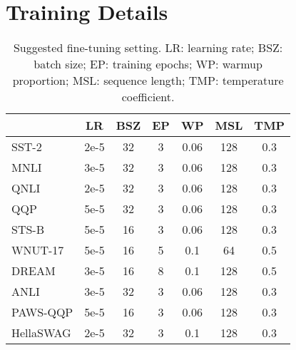 \documentclass[letterpaper]{article} \usepackage{aaai23}  \usepackage{times}  \usepackage{helvet}  \usepackage{courier}  \usepackage[hyphens]{url}  \usepackage{graphicx} \urlstyle{rm} \def\UrlFont{\rm}  \usepackage{natbib}  \usepackage{caption} \frenchspacing  \setlength{\pdfpagewidth}{8.5in}  \setlength{\pdfpageheight}{11in}  \usepackage{algorithm}
\begin{document}


\appendix

\section{Training Details}

\begin{table}[H]
\centering
\small
\begin{tabular}{@{}lcccccc@{}}
\toprule
          & LR     & BSZ     & EP      & WP      & MSL     & TMP \\ \midrule
SST-2     & 2e-5   & 32      & 3       & 0.06    & 128     & 0.3 \\
MNLI      & 3e-5   & 32      & 3       & 0.06    & 128     & 0.3 \\
QNLI      & 2e-5   & 32      & 3       & 0.06    & 128     & 0.3 \\
QQP       & 5e-5   & 32      & 3       & 0.06    & 128     & 0.3 \\
STS-B     & 5e-5   & 16      & 3       & 0.06    & 128     & 0.3 \\
WNUT-17   & 5e-5   & 16      & 5       & 0.1     & 64      & 0.5 \\
DREAM     & 3e-5   & 16      & 8       & 0.1     & 128     & 0.5 \\
ANLI      & 3e-5   & 32      & 3       & 0.06    & 128     & 0.3 \\
PAWS-QQP  & 5e-5   & 16      & 3       & 0.06    & 128     & 0.3 \\
HellaSWAG & 2e-5   & 32      & 3       & 0.1     & 128     & 0.3 \\ \bottomrule
\end{tabular}
\caption{Suggested fine-tuning setting. LR: learning rate; BSZ: batch size; EP: training epochs; WP: warmup proportion; MSL: sequence length; TMP: temperature coefficient.}
\label{t7}
\end{table}
\end{document}
